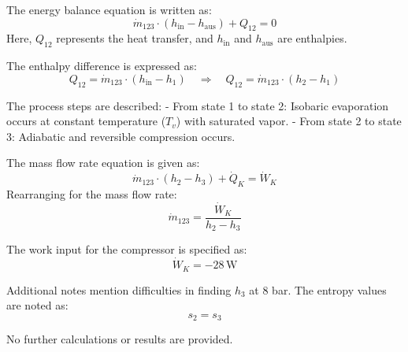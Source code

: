 The energy balance equation is written as:  
\[
\dot{m}_{123} \cdot (h_{\text{in}} - h_{\text{aus}}) + Q_{12} = 0
\]  
Here, \( Q_{12} \) represents the heat transfer, and \( h_{\text{in}} \) and \( h_{\text{aus}} \) are enthalpies.  

The enthalpy difference is expressed as:  
\[
Q_{12} = \dot{m}_{123} \cdot (h_{\text{in}} - h_1) \quad \Rightarrow \quad Q_{12} = \dot{m}_{123} \cdot (h_2 - h_1)
\]  

The process steps are described:  
- From state 1 to state 2: Isobaric evaporation occurs at constant temperature (\( T_v \)) with saturated vapor.  
- From state 2 to state 3: Adiabatic and reversible compression occurs.  

The mass flow rate equation is given as:  
\[
\dot{m}_{123} \cdot (h_2 - h_3) + \dot{Q}_K = \dot{W}_K
\]  
Rearranging for the mass flow rate:  
\[
\dot{m}_{123} = \frac{\dot{W}_K}{h_2 - h_3}
\]  

The work input for the compressor is specified as:  
\[
\dot{W}_K = -28 \, \text{W}
\]  

Additional notes mention difficulties in finding \( h_3 \) at 8 bar. The entropy values are noted as:  
\[
s_2 = s_3
\]  

No further calculations or results are provided.